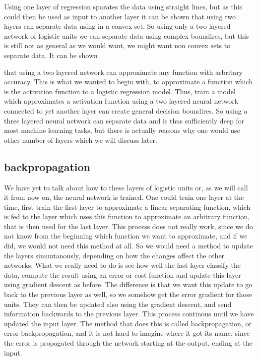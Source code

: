 Using one layer of regression sparates the data using straight lines, but as this could then be used as input to another layer it can be shown that using two layers can separate data using in a convex set. So using only a two layered network of logistic units we can separate data using complex boundires, but this is still not as general as we would want, we might want non convex sets to separate data. It can be shown


that using a two layered network can approximate any function with arbritary accuracy. This is what we wanted to begin with, to approximate a function which is the activation function to a logistic regression model. Thus, train a model which approximates a activation function using a two layered neural network connected to yet another layer can create general decision boundires. So using a three layered neural network can separate data and is thus sufficiently deep for most machine learning tasks, but there is actually reasons why one would use other number of layers which we will discuss later.

\subsection{backpropagation}

We have yet to talk about how to these layers of logistic units or, as we will call it from now on, the neural network is trained. One could train one layer at the time, first train the first layer to approximate a linear separating function, which is fed to the layer which uses this function to approximate an arbitrary function, that is then used for the last layer. This process does not really work, since we do not know from the beginning which function we want to approximate, and if we did, we would not need this method at all. So we would need a method to update the layers simuntanously, depending on how the changes affect the other networks. What we really need to do is see how well the last layer classify the data, compute the result using an error or cost function and update this layer using gradient descent as before. The difference is that we want this update to go back to the previous layer as well, so we somehow get the error gradient for those units. They can then be updated also using the gradient descent, and send information backwards to the previous layer. This process continous until we have updated the input layer. The method that does this is called backpropagation, or error backpropagation, and it is not hard to imagine where it got its name, since the error is propagated through the network starting at the output, ending at the input.

